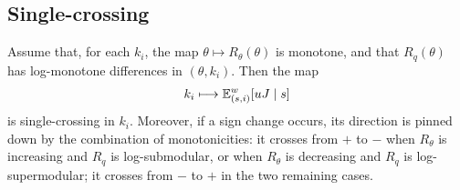 \documentclass[master.tex]{subfiles}
\begin{document}
\subsection{Single-crossing}

\begin{lemma}\label{lem:SC-dir}
Assume that, for each \(k_i\), the map \(\theta\mapsto R_\theta(\theta)\) is monotone, and that \(R_q(\theta)\) has log-monotone differences in \((\theta,k_i)\). Then the map
\[
k_i \longmapsto \mathbb{E}_{(s,i)}^w[uJ\mid s]
\]
is single-crossing in $k_i$. Moreover, if a sign change occurs, its direction is pinned down by the combination of monotonicities: it crosses from $+$ to $-$ when $R_\theta$ is increasing and $R_q$ is log-submodular, or when $R_\theta$ is decreasing and $R_q$ is log-supermodular; it crosses from $-$ to $+$ in the two remaining cases.
\end{lemma}
\end{document}
